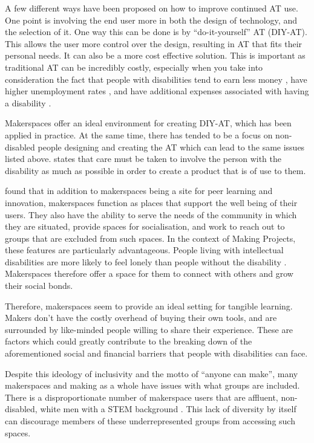 \documentclass{l4proj}
\begin{document}
A few different ways have been proposed on how to improve continued AT use. One point is involving the end user more in both the design of technology, and the selection of it. One way this can be done is by “do-it-yourself” AT (DIY-AT). This allows the user more control over the design, resulting in AT that fits their personal needs.  It can also be a more cost effective solution. This is important as traditional AT can be incredibly costly, especially when you take into consideration the fact that people with disabilities tend to earn less money \citep{Off2022}, have higher unemployment rates \citep{Dep2022}, and have additional expenses associated with having a disability \citep{Joh2019}.  

Makerspaces offer an ideal environment for creating DIY-AT, which has been applied in practice. At the same time, there has tended to be a focus on non-disabled people designing and creating the AT which can lead to the same issues listed above. \cite{Hoo2014} states that care must be taken to involve the person with the disability as much as possible in order to create a product that is of use to them.  

\cite{Tay2016} found that in addition to makerspaces being a site for peer learning and innovation, makerspaces function as places that support the well being of their users. They also have the ability to serve the needs of the community in which they are situated, provide spaces for socialisation, and work to reach out to groups that are excluded from such spaces. In the context of Making Projects, these features are particularly advantageous. People living with intellectual disabilities are more likely to feel lonely than people without the disability \citep{Ale2018}. Makerspaces therefore offer a space for them to connect with others and grow their social bonds.

Therefore, makerspaces seem to provide an ideal setting for tangible learning. Makers don’t have the costly overhead of buying their own tools, and are surrounded by like-minded people willing to share their experience. These are factors which could greatly contribute to the breaking down of the aforementioned social and financial barriers that people with disabilities can face. 

Despite this ideology of inclusivity and the motto of “anyone can make”, many makerspaces and making as a whole have issues with what groups are included. There is a disproportionate number of makerspace users that are affluent, non-disabled, white men with a STEM background \citep{Mak2013}. This lack of diversity by itself can discourage members of these underrepresented groups from accessing such spaces. 
\end{document}
